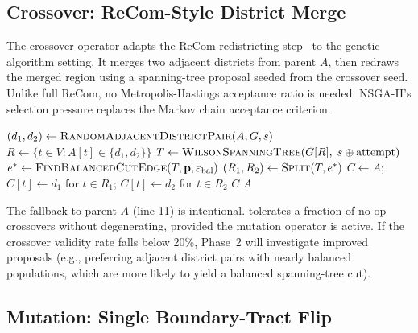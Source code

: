 \subsection{Crossover: ReCom-Style District Merge}

The crossover operator adapts the ReCom redistricting step~\citep{deford2021}
to the genetic algorithm setting.
It merges two adjacent districts from parent $A$, then redraws the merged
region using a spanning-tree proposal seeded from the crossover seed.
Unlike full ReCom, no Metropolis-Hastings acceptance ratio is needed:
NSGA-II's selection pressure replaces the Markov chain acceptance criterion.

\begin{algorithm}[t]
\caption{\textsc{Crossover}($A$, $B$, $G$, $\mathbf{p}$, $k$, $s$)}
\label{alg:crossover}
\begin{algorithmic}[1]
\State $(d_1, d_2) \gets \textsc{RandomAdjacentDistrictPair}(A, G, s)$
\State $R \gets \{t \in V : A[t] \in \{d_1, d_2\}\}$
  \State $T \gets \textsc{WilsonSpanningTree}(G[R],\; s \oplus \mathrm{attempt})$
  \State $e^* \gets \textsc{FindBalancedCutEdge}(T, \mathbf{p}, \varepsilon_{\mathrm{bal}})$
    \State $(R_1, R_2) \gets \textsc{Split}(T, e^*)$
    \State $C \gets A$; \quad $C[t] \gets d_1$ for $t \in R_1$; \quad
      $C[t] \gets d_2$ for $t \in R_2$
    \State \Return $C$
  \EndIf
\EndFor
\State \Return $A$
\end{algorithmic}
\end{algorithm}

The fallback to parent $A$ (line 11) is intentional.
\nsga{} tolerates a fraction of no-op crossovers without degenerating,
provided the mutation operator is active.
If the crossover validity rate falls below 20\%, Phase~2 will investigate
improved proposals (e.g., preferring adjacent district pairs with nearly
balanced populations, which are more likely to yield a balanced spanning-tree
cut).

\subsection{Mutation: Single Boundary-Tract Flip}

